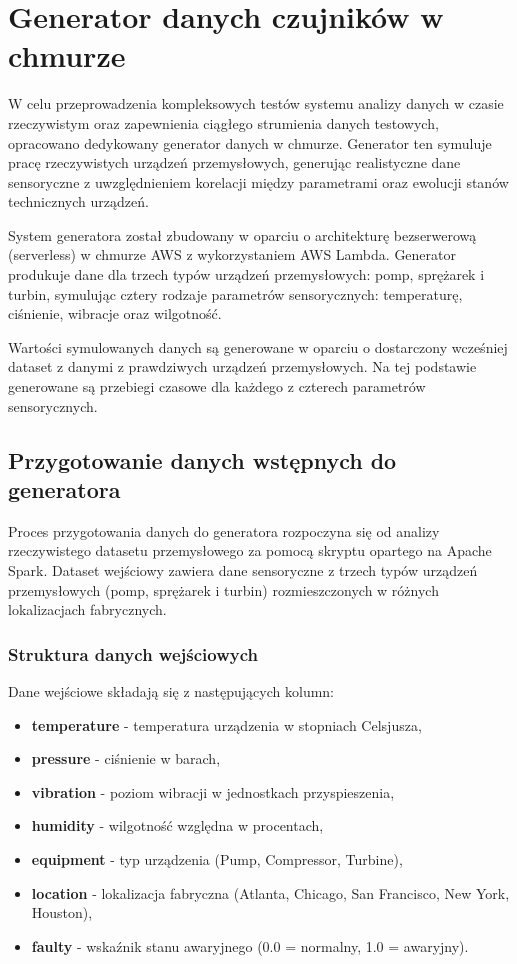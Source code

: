 \section{Generator danych czujników w chmurze}
\label{sec:implementacja_generowania}

W celu przeprowadzenia kompleksowych testów systemu analizy danych w czasie rzeczywistym oraz zapewnienia ciągłego strumienia danych testowych, opracowano dedykowany generator danych w chmurze. Generator ten symuluje pracę rzeczywistych urządzeń przemysłowych, generując realistyczne dane sensoryczne z uwzględnieniem korelacji między parametrami oraz ewolucji stanów technicznych urządzeń.

System generatora został zbudowany w oparciu o architekturę bezserwerową (serverless) w chmurze AWS z wykorzystaniem AWS Lambda. Generator produkuje dane dla trzech typów urządzeń przemysłowych: pomp, sprężarek i turbin, symulując cztery rodzaje parametrów sensorycznych: temperaturę, ciśnienie, wibracje oraz wilgotność.

Wartości symulowanych danych są generowane w oparciu o dostarczony wcześniej dataset z danymi z prawdziwych urządzeń przemysłowych. Na tej podstawie generowane są przebiegi czasowe dla każdego z czterech parametrów sensorycznych.

\subsection{Przygotowanie danych wstępnych do generatora}

Proces przygotowania danych do generatora rozpoczyna się od analizy rzeczywistego datasetu przemysłowego za pomocą skryptu opartego na Apache Spark. Dataset wejściowy zawiera dane sensoryczne z trzech typów urządzeń przemysłowych (pomp, sprężarek i turbin) rozmieszczonych w różnych lokalizacjach fabrycznych.

\subsubsection{Struktura danych wejściowych}

Dane wejściowe składają się z następujących kolumn:
\begin{itemize}
    \item \textbf{temperature} - temperatura urządzenia w stopniach Celsjusza,
    \item \textbf{pressure} - ciśnienie w barach,
    \item \textbf{vibration} - poziom wibracji w jednostkach przyspieszenia,
    \item \textbf{humidity} - wilgotność względna w procentach,
    \item \textbf{equipment} - typ urządzenia (Pump, Compressor, Turbine),
    \item \textbf{location} - lokalizacja fabryczna (Atlanta, Chicago, San Francisco, New York, Houston),
    \item \textbf{faulty} - wskaźnik stanu awaryjnego (0.0 = normalny, 1.0 = awaryjny).
\end{itemize}

